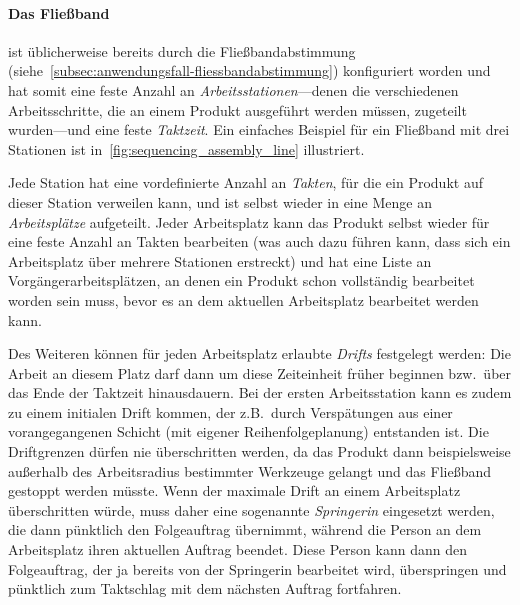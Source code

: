 \paragraph{Das Fließband}
ist üblicherweise bereits durch die Fließbandabstimmung (siehe~\cref{subsec:anwendungsfall-fliessbandabstimmung})
konfiguriert worden und hat somit eine feste Anzahl an \emph{Arbeitsstationen}---denen die verschiedenen Arbeitsschritte,
die an einem Produkt ausgeführt werden müssen, zugeteilt wurden---und eine feste \emph{Taktzeit}.
Ein einfaches Beispiel für ein Fließband mit drei Stationen ist in~\cref{fig:sequencing_assembly_line} illustriert.

Jede Station hat eine vordefinierte Anzahl an \emph{Takten}, für die ein Produkt auf dieser Station verweilen kann,
und ist selbst wieder in eine Menge an \emph{Arbeitsplätze} aufgeteilt.
Jeder Arbeitsplatz kann das Produkt selbst wieder für eine feste Anzahl an Takten bearbeiten
(was auch dazu führen kann, dass sich ein Arbeitsplatz über mehrere Stationen erstreckt)
und hat eine Liste an Vorgängerarbeitsplätzen, an denen ein Produkt schon vollständig bearbeitet worden sein muss,
bevor es an dem aktuellen Arbeitsplatz bearbeitet werden kann. %

Des Weiteren können für jeden Arbeitsplatz erlaubte \emph{Drifts} festgelegt werden:
Die Arbeit an diesem Platz darf dann um diese Zeiteinheit früher beginnen bzw.\
über das Ende der Taktzeit hinausdauern.
Bei der ersten Arbeitsstation kann es zudem zu einem initialen Drift kommen,
der z.B.\ durch Verspätungen aus einer vorangegangenen Schicht (mit eigener Reihenfolgeplanung) entstanden ist.
Die Driftgrenzen dürfen nie überschritten werden,
da das Produkt dann beispielsweise außerhalb des Arbeitsradius bestimmter Werkzeuge gelangt und das Fließband gestoppt werden müsste.
Wenn der maximale Drift an einem Arbeitsplatz überschritten würde, muss daher eine sogenannte \emph{Springerin} eingesetzt werden,
die dann pünktlich den Folgeauftrag übernimmt, während die Person an dem Arbeitsplatz ihren aktuellen Auftrag beendet.
Diese Person kann dann den Folgeauftrag, der ja bereits von der Springerin bearbeitet wird,
überspringen und pünktlich zum Taktschlag mit dem nächsten Auftrag fortfahren.

